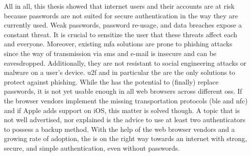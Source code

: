 All in all, this thesis showed that internet users and their accounts are at risk because passwords are not suited for secure authentication in the way they are currently used. Weak passwords, password re-usage, and data breaches expose a constant threat. It is crucial to sensitize the user that these threats affect each and everyone. Moreover, existing \gls{mfa} solutions are prone to phishing attacks since the way of transmission via \gls{sms} and e-mail is insecure and can be eavesdropped. Additionally, they are not resistant to social engineering attacks or malware on a user's device. \gls{u2f} and in particular the \wa{} are the only solutions to protect against phishing. While the \wa{} has the potential to (finally) replace passwords, it is not yet usable enough in all web browsers across different \glspl{os}. If the browser vendors implement the missing transportation protocols (\gls{ble} and \gls{nfc}) and if Apple adds support on iOS, this matter is solved though. A topic that is not well advertised, nor explained is the advice to use at least two authenticators to possess a backup method. With the help of the web browser vendors and a growing rate of adoption, the \wa{} is on the right way towards an internet with strong, secure, and simple authentication, even without passwords.